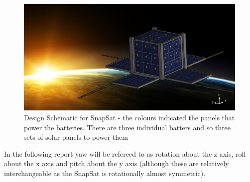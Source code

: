 \begin{figure}[H]
\includegraphics[width=\textwidth]{Picture1}
\caption{Design Schematic for SnapSat - the colours indicated the panels that power the batteries. There are three individual batters and so three sets of solar panels to power them}
\label{fig:flower}
\end{figure}
\noindent
In the following report yaw will be refereed to as rotation about the z axis, roll about the x axis and pitch about the y axis (although these are relatively interchangeable as the SnapSat is rotationally almost symmetric).

\begin{figure}[H]
\end{figure}
